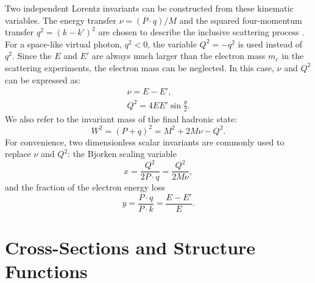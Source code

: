 Two independent Lorentz invariants can be constructed from these kinematic variables. The energy transfer $\nu=(P\cdot q)/M$ and the squared four-momentum transfer $q^2=(k-k')^2$ are chosen to describe the inclusive scattering process \cite{Halzen1984}. For a space-like virtual photon, $q^2<0$, the variable $Q^2=-q^2$ is used instead of $q^2$. Since the $E$ and $E'$ are always much larger than the electron mass $m_e$ in the scattering experiments, the electron mass can be neglected. In this case, $\nu$ and $Q^2$ can be expressed as:
\begin{gather} \label{C2S1E1}
\nu = E-E', \\ \label{C2S1E2}
Q^2 = 4EE'\sin\frac{\theta}{2}.
\end{gather}
We also refer to the invariant mass of the final hadronic state:
\begin{equation} \label{C2S1E3}
W^2 = (P+q)^2 = M^2+2M\nu-Q^2.
\end{equation}
For convenience, two dimensionless scalar invariants are commonly used to replace $\nu$ and $Q^2$: the Bjorken scaling variable
\begin{equation}  \label{C2S1E4}
x = \frac{Q^2}{2P\cdot q}=\frac{Q^2}{2M\nu},
\end{equation}
and the fraction of the electron energy loss
\begin{equation} \label{C2S1E5}
y = \frac{P\cdot q}{P\cdot k}=\frac{E-E'}{E}.
\end{equation}

\section{Cross-Sections and Structure Functions}
\label{C2S2}

